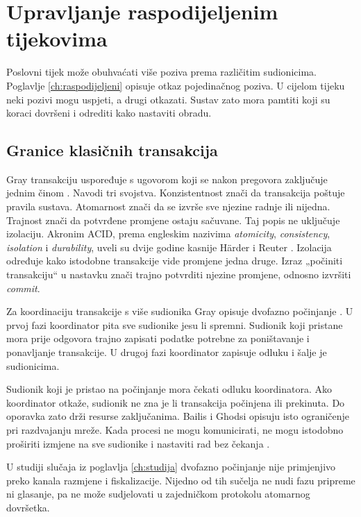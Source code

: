 \section{Upravljanje raspodijeljenim tijekovima}
\label{ch:tijekovi}

Poslovni tijek može obuhvaćati više poziva prema različitim sudionicima.
Poglavlje \ref{ch:raspodijeljeni} opisuje otkaz pojedinačnog poziva. U cijelom
tijeku neki pozivi mogu uspjeti, a drugi otkazati. Sustav zato mora pamtiti
koji su koraci dovršeni i odrediti kako nastaviti obradu.

\subsection{Granice klasičnih transakcija}
\label{sec:granica-transakcije}

Gray transakciju uspoređuje s ugovorom koji se nakon pregovora zaključuje
jednim činom \cite{gray1981transaction}. Navodi tri svojstva. Konzistentnost
znači da transakcija poštuje pravila sustava. Atomarnost znači da se izvrše
sve njezine radnje ili nijedna. Trajnost znači da potvrđene promjene ostaju
sačuvane. Taj popis ne uključuje izolaciju. Akronim ACID, prema engleskim nazivima
\emph{atomicity}, \emph{consistency}, \emph{isolation} i \emph{durability},
uveli su dvije godine kasnije Härder i Reuter
\cite{haerder1983principles}. Izolacija određuje kako istodobne transakcije
vide promjene jedna druge. Izraz „počiniti transakciju“
u nastavku znači trajno potvrditi njezine promjene, odnosno izvršiti
\emph{commit}.

Za koordinaciju transakcije s više sudionika Gray opisuje dvofazno
počinjanje \cite{gray1978notes}. U prvoj fazi koordinator pita sve sudionike
jesu li spremni. Sudionik koji pristane mora prije odgovora trajno zapisati
podatke potrebne za poništavanje i ponavljanje transakcije. U drugoj fazi
koordinator zapisuje odluku i šalje je sudionicima.

Sudionik koji je pristao na počinjanje mora čekati odluku koordinatora. Ako
koordinator otkaže, sudionik ne zna je li transakcija počinjena ili prekinuta.
Do oporavka zato drži resurse zaključanima. Bailis i Ghodsi opisuju isto
ograničenje pri razdvajanju mreže. Kada procesi ne mogu komunicirati, ne mogu
istodobno proširiti izmjene na sve sudionike i nastaviti rad bez čekanja
\cite{bailis2013eventual}.

U studiji slučaja iz poglavlja \ref{ch:studija} dvofazno počinjanje nije
primjenjivo preko kanala razmjene i fiskalizacije. Nijedno od tih sučelja ne
nudi fazu pripreme ni glasanje, pa ne može sudjelovati u zajedničkom
protokolu atomarnog dovršetka.

